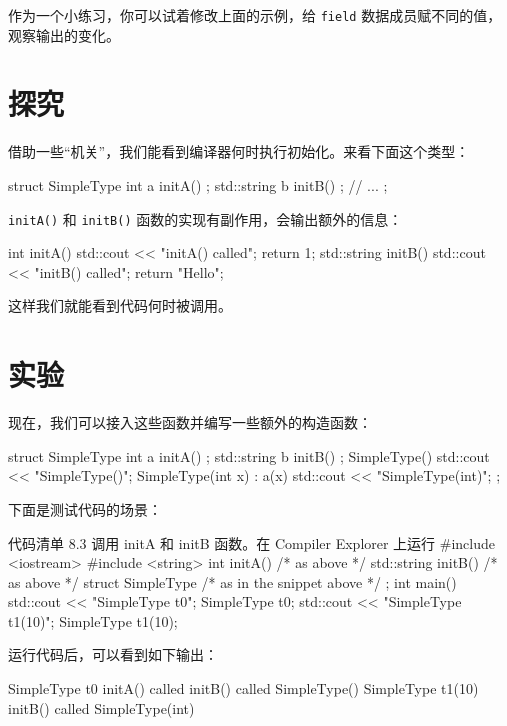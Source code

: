 作为一个小练习，你可以试着修改上面的示例，给 \texttt{field} 数据成员赋不同的值，观察输出的变化。

\section{探究}

借助一些“机关”，我们能看到编译器何时执行初始化。来看下面这个类型：

\begin{codebox}[cpp]
struct SimpleType {
    int a { initA() };
    std::string b { initB() };
    // ...
};
\end{codebox}

\texttt{initA()} 和 \texttt{initB()} 函数的实现有副作用，会输出额外的信息：

\begin{codebox}[cpp]
int initA() {
    std::cout << "initA() called\n";
    return 1;
}
std::string initB() {
    std::cout << "initB() called\n";
    return "Hello";
}
\end{codebox}

这样我们就能看到代码何时被调用。

\section{实验}

现在，我们可以接入这些函数并编写一些额外的构造函数：

\begin{codebox}[cpp]
struct SimpleType {
    int a { initA() };
    std::string b { initB() };
    SimpleType() { std::cout << "SimpleType()\n"; }
    SimpleType(int x) : a(x) { std::cout << "SimpleType(int)\n"; }
};
\end{codebox}

下面是测试代码的场景：

\begin{codeboxt}[cpp]{代码清单 8.3 调用 initA 和 initB 函数。在 Compiler Explorer 上运行}
#include <iostream>
#include <string>
int initA() { /* as above */ }
std::string initB() { /* as above */ }
struct SimpleType { /* as in the snippet above */ };
int main() {
    std::cout << "SimpleType t0\n";
    SimpleType t0;
    std::cout << "SimpleType t1(10)\n";
    SimpleType t1(10);
}
\end{codeboxt}

运行代码后，可以看到如下输出：

\begin{codebox}[cpp]
SimpleType t0
initA() called
initB() called
SimpleType()
SimpleType t1(10)
initB() called
SimpleType(int)
\end{codebox}

